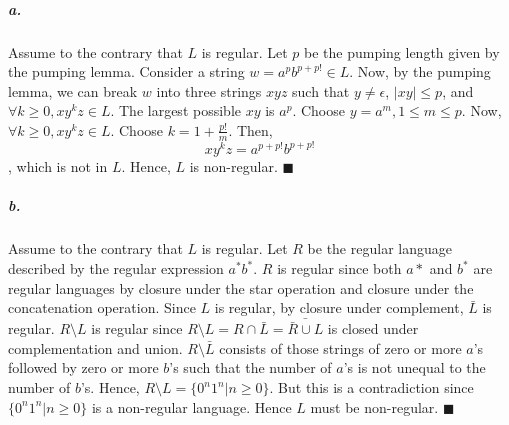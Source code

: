 \documentclass[]{article}
\begin{document}
	\subparagraph{a.} Assume to the contrary that $L$ is regular.
	Let $p$ be the pumping length given by the pumping lemma. Consider a string $w = a^p b^{p+p!} \in L$. Now, by the pumping lemma, we can break $w$ into three strings $xyz$ such that $y \neq \epsilon$, $|xy| \leq p$, and $\forall k \geq 0, xy^k z \in L$. The largest possible $xy$ is $a^p$. Choose $y = a^m, 1 \leq m \leq p$. Now, $\forall k \geq 0, xy^k z \in L$. Choose $k=1+\frac{p!}{m}. $ Then, $$xy^k z = a^{p+p!} b^{p+p!}$$, which is not in $L$. Hence, $L$ is non-regular. $\blacksquare$
	
	\subparagraph{b.}  Assume to the contrary that $L$ is regular. Let $R$ be the regular language described by the regular expression $a^*b^*$. $R$ is regular since both $a*$ and $b^*$ are regular languages by closure under the star operation and closure under the concatenation operation. Since $L$ is regular, by closure under complement, $\bar{L}$ is regular. $R \setminus L$ is regular since $R \setminus L = R \cap \bar{L} = \bar{\bar{R} \cup L}$ is closed under complementation and union. $R \setminus \bar{L}$ consists of those strings of zero or more $a$'s followed by zero or more $b$'s such that the number of $a$'s is not unequal to the number of $b$'s. Hence, $R \setminus L = \{0^n 1^n | n \geq 0\}$. But this is a contradiction since $\{0^n 1^n | n \geq 0\}$ is a non-regular language. Hence $L$ must be non-regular. $\blacksquare$
	
	\pagebreak
	
\end{document}

